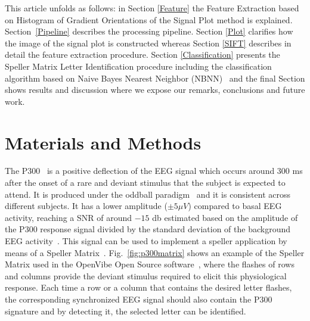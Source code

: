\documentclass[entropy,article,submit,moreauthors,pdftex,10pt,a4paper]{mdpi}
\begin{document}
This article unfolds as follows: in Section \ref{Feature} the Feature Extraction based on Histogram of Gradient Orientations of the Signal Plot method is explained. Section~\ref{Pipeline} describes the processing pipeline.  Section \ref{Plot}  clarifies how the image of the signal plot is constructed whereas Section \ref{SIFT}  describes in detail the feature extraction procedure.  Section \ref{Classification}  presents the Speller Matrix Letter Identification procedure including the classification algorithm based on Naive Bayes Nearest Neighbor (NBNN)~\citep{Boiman2008} and the final Section shows results and discussion where we expose our remarks, conclusions and future work.

\section{Materials and Methods}

The P300~\citep{Farwell1988,Knuth2006} is a positive deflection of the EEG signal which occurs around $300$ ms after the onset of a rare and deviant stimulus that the subject is expected to attend.  It is produced under the oddball paradigm~\cite{WolpawJonathanR2012} and it is consistent across different subjects. It has a lower amplitude  ($\pm 5 \mu V $) compared to basal EEG activity, reaching a SNR of around $-15$ db estimated based on the amplitude of the P300 response signal divided by the standard deviation of the background EEG activity~\citep{Hu2010}.  This signal can be used to implement a speller application by means of a Speller Matrix~\citep{Farwell1988}. Fig.~\ref{fig:p300matrix} shows an example of the Speller Matrix used in the OpenVibe Open Source software~\citep{Renard2010}, where the flashes of rows and columns provide the deviant stimulus required to elicit this physiological response.   Each time a row or a column that contains the desired letter flashes, the corresponding synchronized EEG signal should also contain the P300 signature and by detecting it, the selected letter can be identified.
\end{document}
